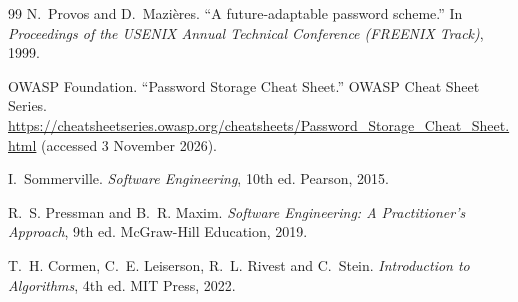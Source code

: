 \begin{thebibliography}{99}
 N.~Provos and D.~Mazi\`eres. ``A future-adaptable password scheme.'' In \emph{Proceedings of the USENIX Annual Technical Conference (FREENIX Track)}, 1999.

 OWASP Foundation. ``Password Storage Cheat Sheet.'' OWASP Cheat Sheet Series. \url{https://cheatsheetseries.owasp.org/cheatsheets/Password_Storage_Cheat_Sheet.html} (accessed 3 November 2026).

 I.~Sommerville. \emph{Software Engineering}, 10th ed. Pearson, 2015.

 R.~S. Pressman and B.~R. Maxim. \emph{Software Engineering: A Practitioner's Approach}, 9th ed. McGraw-Hill Education, 2019.

 T.~H. Cormen, C.~E. Leiserson, R.~L. Rivest and C.~Stein. \emph{Introduction to Algorithms}, 4th ed. MIT Press, 2022.

\end{thebibliography}

